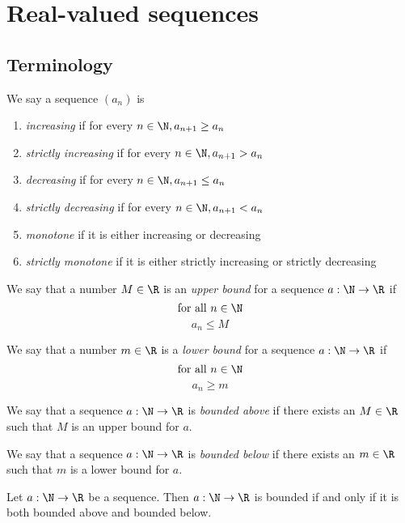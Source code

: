 \section{Real-valued sequences}

\subsection{Terminology}
\begin{definition}
    We say a sequence $(a_n)$ is 
    \begin{enumerate}
        \item \emph{increasing} if for every $n \in \N, a_{n+1} \ge a_n$
        \item \emph{strictly increasing} if for every $n \in \N, a_{n+1} > a_n$
        \item \emph{decreasing} if for every $n \in \N, a_{n+1} \le a_n$
        \item \emph{strictly decreasing} if for every $n \in \N, a_{n+1} < a_n$
        \item \emph{monotone} if it is either increasing or decreasing
        \item \emph{strictly monotone} if it is either strictly increasing or strictly decreasing
    \end{enumerate}
\end{definition}

\begin{definition}
    We say that a number $M \in \R$ is an \emph{upper bound} for a sequence $a: \N \to \R$ if
    $$\text{for all } n \in \N$$
    $$a_n \le M$$

    We say that a number $m \in \R$ is a \emph{lower bound} for a sequence $a: \N \to \R$ if
    $$\text{for all } n \in \N$$
    $$a_n \ge m$$
\end{definition}

\begin{definition}
    We say that a sequence $a: \N \to \R$ is \emph{bounded above} if there exists an $M \in \R$ such that $M$ is an upper bound for $a$.

    We say that a sequence $a: \N \to \R$ is \emph{bounded below} if there exists an $m \in \R$ such that $m$ is a lower bound for $a$.
\end{definition}

\begin{proposition}
    Let $a: \N \to \R$ be a sequence. Then $a: \N \to \R$ is bounded if and only if it is both bounded above and bounded below.
\end{proposition}

